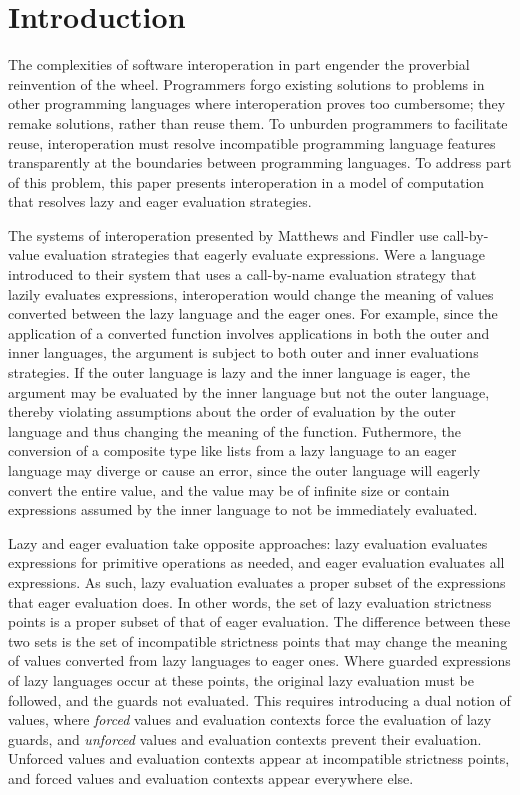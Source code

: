 \section{Introduction}

The complexities of software interoperation in part engender the proverbial reinvention of the wheel. Programmers forgo existing solutions to problems in other programming languages where interoperation proves too cumbersome; they remake solutions, rather than reuse them. To unburden programmers to facilitate reuse, interoperation must resolve incompatible programming language features transparently at the boundaries between programming languages. To address part of this problem, this paper presents interoperation in a model of computation that resolves lazy and eager evaluation strategies.

The systems of interoperation presented by Matthews and Findler \cite{matthews07} use call-by-value evaluation strategies that eagerly evaluate expressions. Were a language introduced to their system that uses a call-by-name evaluation strategy that lazily evaluates expressions, interoperation would change the meaning of values converted between the lazy language and the eager ones. For example, since the application of a converted function involves applications in both the outer and inner languages, the argument is subject to both outer and inner evaluations strategies. If the outer language is lazy and the inner language is eager, the argument may be evaluated by the inner language but not the outer language, thereby violating assumptions about the order of evaluation by the outer language and thus changing the meaning of the function. Futhermore, the conversion of a composite type like lists from a lazy language to an eager language may diverge or cause an error, since the outer language will eagerly convert the entire value, and the value may be of infinite size or contain expressions assumed by the inner language to not be immediately evaluated.

Lazy and eager evaluation take opposite approaches: lazy evaluation evaluates expressions for primitive operations as needed, and eager evaluation evaluates all expressions. As such, lazy evaluation evaluates a proper subset of the expressions that eager evaluation does. In other words, the set of lazy evaluation strictness points is a proper subset of that of eager evaluation. The difference between these two sets is the set of incompatible strictness points that may change the meaning of values converted from lazy languages to eager ones. Where guarded expressions of lazy languages occur at these points, the original lazy evaluation must be followed, and the guards not evaluated. This requires introducing a dual notion of values, where \emph{forced} values and evaluation contexts force the evaluation of lazy guards, and \emph{unforced} values and evaluation contexts prevent their evaluation. Unforced values and evaluation contexts appear at incompatible strictness points, and forced values and evaluation contexts appear everywhere else.